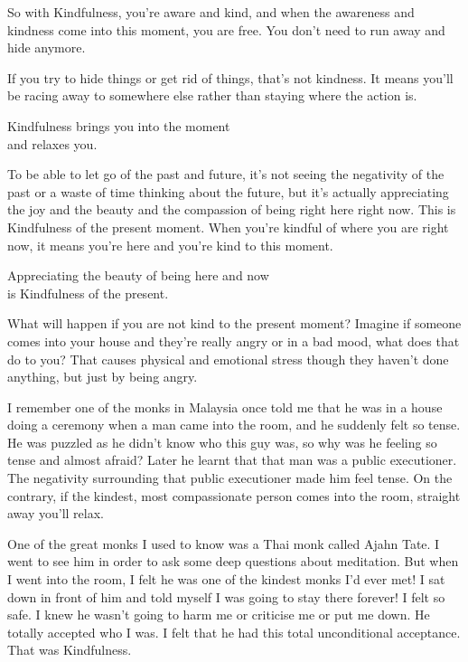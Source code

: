 \documentclass[12pt, openany]{book}
\newenvironment{aphorism}%
{%
\begin{center}\begin{itshape}
}%
{\end{itshape}\end{center}
}%
\begin{document}
So with Kindfulness, you’re aware and kind, and when the awareness and kindness come into this moment, you are free. You don’t need to run away and hide anymore. 

If you try to hide things or get rid of things, that’s not kindness. It means you’ll be racing away to somewhere else rather than staying where the action is. 

\begin{aphorism}
Kindfulness brings you into the moment\\  
and relaxes you.
\end{aphorism}

To be able to let go of the past and future, it’s not seeing the negativity of the past or a waste of time thinking about the future, but it’s actually appreciating the joy and the beauty and the compassion of being right here right now. This is Kindfulness of the present moment. When you’re kindful of where you are right now, it means you’re here and you’re kind to this moment. 

\begin{aphorism}
Appreciating the beauty of being here and now\\  
is Kindfulness of the present.
\end{aphorism}

What will happen if you are not kind to the present moment? Imagine if someone comes into your house and they’re really angry or in a bad mood, what does that do to you? That causes physical and emotional stress though they haven’t done anything, but just by being angry. 

I remember one of the monks in Malaysia once told me that he was in a house doing a ceremony when a man came into the room, and he suddenly felt so tense. He was puzzled as he didn’t know who this guy was, so why was he feeling so tense and almost afraid? Later he learnt that that man was a public executioner. The negativity surrounding that public executioner made him feel tense. On the contrary, if the kindest, most compassionate person comes into the room, straight away you’ll relax. 

One of the great monks I used to know was a Thai monk called Ajahn Tate. I went to see him in order to ask some deep questions about meditation. But when I went into the room, I felt he was one of the kindest monks I’d ever met! I sat down in front of him and told myself I was going to stay there forever! I felt so safe. I knew he wasn’t going to harm me or criticise me or put me down. He totally accepted who I was. I felt that he had this total unconditional acceptance. That was Kindfulness. 
\end{document}
